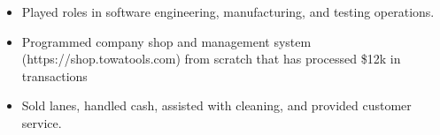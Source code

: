 \documentclass[10pt,a4paper,ragged2e,withhyper]{altacv}
\begin{document}
\begin{paracol}{2}
            \begin{itemize}
                \item Played roles in software engineering, manufacturing, and testing operations.
                \item Programmed company shop and management system (https://shop.towatools.com) from scratch that has processed \$12k in transactions
            \end{itemize}
            \divider
            \begin{itemize}
                \item Sold lanes, handled cash, assisted with cleaning, and provided customer service.
            \end{itemize}
            
            

\end{paracol}
\end{document}
